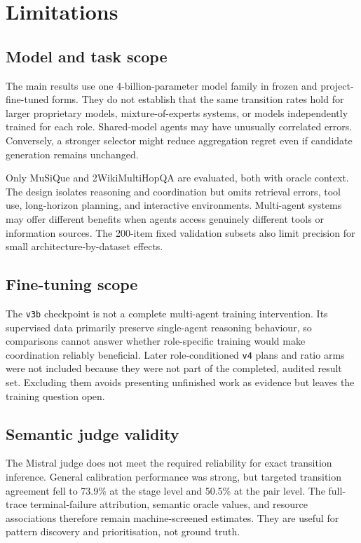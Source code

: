 \chapter{Limitations}
\label{chap:limitations}

\section{Model and task scope}

The main results use one 4-billion-parameter model family in frozen and project-fine-tuned forms. They do not establish that the same transition rates hold for larger proprietary models, mixture-of-experts systems, or models independently trained for each role. Shared-model agents may have unusually correlated errors. Conversely, a stronger selector might reduce aggregation regret even if candidate generation remains unchanged.

Only MuSiQue and 2WikiMultiHopQA are evaluated, both with oracle context. The design isolates reasoning and coordination but omits retrieval errors, tool use, long-horizon planning, and interactive environments. Multi-agent systems may offer different benefits when agents access genuinely different tools or information sources. The 200-item fixed validation subsets also limit precision for small architecture-by-dataset effects.

\section{Fine-tuning scope}

The \texttt{v3b} checkpoint is not a complete multi-agent training intervention. Its supervised data primarily preserve single-agent reasoning behaviour, so comparisons cannot answer whether role-specific training would make coordination reliably beneficial. Later role-conditioned \texttt{v4} plans and ratio arms were not included because they were not part of the completed, audited result set. Excluding them avoids presenting unfinished work as evidence but leaves the training question open.

\section{Semantic judge validity}

The Mistral judge does not meet the required reliability for exact transition inference. General calibration performance was strong, but targeted transition agreement fell to 73.9\% at the stage level and 50.5\% at the pair level. The full-trace terminal-failure attribution, semantic oracle values, and resource associations therefore remain machine-screened estimates. They are useful for pattern discovery and prioritisation, not ground truth.

